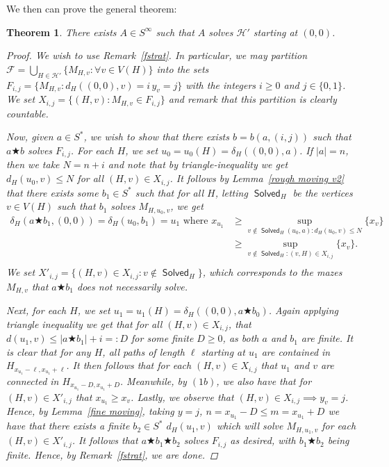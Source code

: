 \documentclass[a4paper]{article}
\newtheorem{thm}{Theorem}
\theoremstyle{definition}
\DeclareMathOperator{\Solve}{\bm{\mathsf{Solved}}}
\begin{document}
We then can prove the general theorem:
\begin{thm} There exists $A \in S^\infty$ such that $A$ solves $\mathcal{H}'$ starting at $(0,0)$.
\begin{proof}
    We wish to use Remark~\ref{fstrat}. In particular, we may partition $\mathcal{F} = \bigcup_{H \in \mathcal{H}'}\{M_{H,v}:\forall v \in V(H)\}$ into the sets $F_{i,j} = \{M_{H,v}: d_H((0,0),v) = i\,y_v = j\}$ with the integers $i \ge 0$ and $j \in \{0,1\}$. We set $X_{i,j} = \{(H,v): M_{H,v} \in F_{i,j}\}$ and remark that this partition is clearly countable.
    
    Now, given $a \in S^*$, we wish to show that there exists $b=b(a,(i,j))$ such that $a\bigstar b$ solves $F_{i,j}$. For each $H$, we set $u_0= u_0(H) = \delta_H((0,0),a)$. If $|a| = n$, then we take $N = n+i$ and note that by triangle-inequality we get $d_H(u_0,v) \le N$ for all $(H,v) \in X_{i,j}$. It follows by Lemma~\ref{rough moving v2} that there exists some $b_1 \in S^*$ such that for all $H$, letting $\Solve_H$ be the vertices $v \in V(H)$ such that $b_1$ solves $M_{H,u_0,v}$, we get   \begin{align*}
        \delta_H(a\bigstar b_1,(0,0)) = \delta_H(u_0,b_1) = u_1\textrm{ where }x_{u_1} &\ge \sup_{v\not \in \Solve_H(u_0,a): d_H(u_0,v)\le N}\{x_v\} \\&\ge  \sup_{v\not \in \Solve_H:(v,H) \in X_{i,j}} \{x_v\}.\tag{1b}\\
    \end{align*}
    We set $X'_{i,j} = \{(H,v)\in X_{i,j}: v \not\in\Solve_H\}$, which corresponds to the mazes $M_{H,v}$ that $a\bigstar b_1$ does not necessarily solve.
    
    Next, for each $H$, we set $u_1 = u_1(H) =\delta_H((0,0),a\bigstar b_0)$. Again applying triangle inequality we get that for all $(H,v) \in X_{i,j}$, that $d(u_1,v) \le |a\bigstar b_1| +i =: D$ for some finite $D\ge 0$, as both $a$ and $b_1$ are finite. It is clear that for any $H$, all paths of length $\ell$ starting at $u_1$ are contained in $H_{x_{u_1}-\ell,x_{u_1}+\ell}$. It then follows that for each $(H,v) \in X_{i,j}$ that $u_1$ and $v$ are connected in $H_{x_{u_1}-D,x_{u_1}+D}$. Meanwhile, by $(1b)$, we also have that for $(H,v) \in X'_{i,j}$ that $x_{u_1} \ge x_v$. Lastly, we observe that $(H,v) \in X_{i,j} \implies y_v = j$. 
    Hence, by Lemma~\ref{fine moving}, taking $y = j$, $n = x_{u_1}-D\le m = x_{u_1}+D$ we have that there exists a finite $b_2 \in S^*$ $d_H(u_1,v)$ which will solve $M_{H,u_1,v}$ for each $(H,v) \in X'_{i,j}$. It follows that $a \bigstar b_1\bigstar b_2$ solves $F_{i,j}$ as desired, with $b_1\bigstar b_2$ being finite. Hence, by Remark~\ref{fstrat}, we are done.
\end{proof}
\end{thm}
\end{document}
